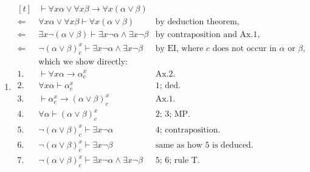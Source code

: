 \begin{enumerate}
  \item $\begin{aligned}[t]
                       & \vdash\forall x \alpha\vee\forall x \beta\to\forall x(\alpha\vee \beta)                                                                              \\
            \Leftarrow & \forall x \alpha\vee \forall x \beta\vdash\forall x(\alpha\vee \beta)               & \text{by deduction theorem,}                                   \\
            \Leftarrow & \exists x\neg(\alpha\vee \beta)\vdash\exists x \neg \alpha\wedge\exists x\neg \beta & \text{by contraposition and Ax.1,}                             \\
            \Leftarrow & \neg(\alpha\vee \beta)_c^x\vdash\exists x \neg \alpha\wedge\exists x\neg \beta      & \text{by EI, where $c$ does not occur in $\alpha$ or $\beta$,} \\
                       & \text{which we show directly:}                                                                                                                       \\
            1.         & \vdash\forall x \alpha\to \alpha_c^x                                                & \text{Ax.2.}                                                   \\
            2.         & \forall x \alpha\vdash \alpha_c^x                                                   & \text{1; ded.}                                                 \\
            3.         & \vdash\alpha_c^x\to (\alpha\vee \beta)_c^x                                          & \text{Ax.1.}                                                   \\
            4.         & \forall \alpha\vdash(\alpha\vee \beta)_c^x                                          & \text{2; 3; MP.}                                               \\
            5.         & \neg(\alpha\vee \beta)_c^x\vdash\exists x\neg \alpha                                & \text{4; contraposition.}                                      \\
            6.         & \neg(\alpha\vee \beta)_c^x\vdash\exists x\neg \beta                                 & \text{same as how 5 is deduced.}                               \\
            7.         & \neg(\alpha\vee \beta)_c^x\vdash\exists x \neg \alpha\wedge\exists x\neg \beta      & \text{5; 6; rule T.}                                           \\
          \end{aligned}$
\end{enumerate}
